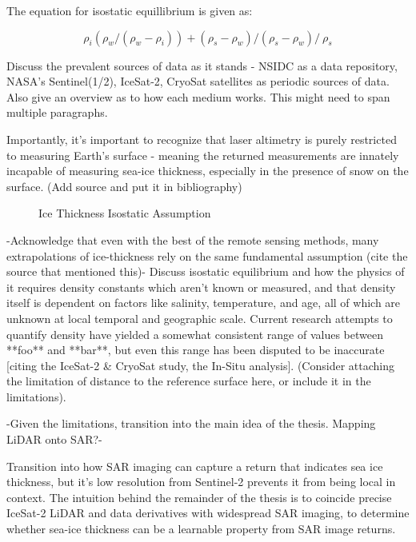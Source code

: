 The equation for isostatic equillibrium is given as: 


\begin{equation*}
	\rho_i
	(\rho_w / (\rho_w-	\rho_i)) + (\rho_s-\rho_w)/(\rho_s - \rho_w)/\
	
	\rho_s
\end{equation*}

Discuss the prevalent sources of data as it stands - NSIDC as a data repository, NASA's Sentinel(1/2), IceSat-2, CryoSat satellites as periodic sources of data. Also give an overview as to how each medium works. This might need to span multiple paragraphs.

Importantly, it's important to recognize that laser altimetry is purely restricted to measuring Earth's surface - meaning the returned measurements are innately incapable of measuring sea-ice thickness, especially in the presence of snow on the surface. (Add source and put it in bibliography)
\begin{figure}[htb]
	\centering
	\caption{Ice Thickness Isostatic Assumption} \cite{ICESat-2-L4-Product}
	\label{fig:hydro-static-diagram}
\end{figure}

-Acknowledge that even with the best of the remote sensing methods, many extrapolations of ice-thickness rely on the same fundamental assumption (cite the source that mentioned this)-
Discuss isostatic equilibrium and how the physics of it requires density constants which aren't known or measured, and that density itself is dependent on factors like salinity, temperature, and age, all of which are unknown at local temporal and geographic scale. Current research attempts to quantify density have yielded a somewhat consistent range of values between **foo** and **bar**, but even this range has been disputed to be inaccurate [citing the IceSat-2 \& CryoSat study, the In-Situ analysis]. (Consider attaching the limitation of distance to the reference surface here, or include it in the limitations).

-Given the limitations, transition into the main idea of the thesis. Mapping LiDAR onto SAR?- 

Transition into how SAR imaging can capture a return that indicates sea ice thickness, but it's low resolution from Sentinel-2 prevents it from being local in context. The intuition behind the remainder of the thesis is to coincide precise IceSat-2 LiDAR and data derivatives with widespread SAR imaging, to determine whether sea-ice thickness can be a learnable property from SAR image returns.

